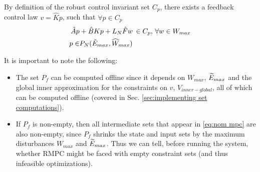 By definition of the robust control invariant set $C_p$, there exists a feedback control law $v=\hat{K}p$, such that $\forall p\in C_p$
\begin{subequations}
\begin{align}
\label{eq:C_def}
\hat{A}p &+ \hat{B}Kp+L_N \hat{F}w \, \in C_p,\, \forall w \in W_{max} \\
p \in &P_N(\tilde{E}_{max}, \widehat{W}_{max})
\end{align}
\end{subequations}

It is important to note the following:
\begin{itemize}
	\item The set $P_f$ can be computed offline since it depends on $W_{max}$, $\widetilde{E}_{max}$ and the global inner approximation for the constraints on $v$, $V_{inner-global}$, all of which can be computed offline (covered in Sec. \ref{sec:implementing set computations}).
	\item If $P_f$ is non-empty, then all intermediate sets that appear in \eqref{eq:nom mpc} are also non-empty, since $P_f$ shrinks the state and input sets by the maximum disturbances $W_{max}$ and $\widetilde{E}_{max}$.	
	Thus we can tell, before running the system, whether RMPC might be faced with empty constraint sets (and thus infeasible optimizations).
\end{itemize}

